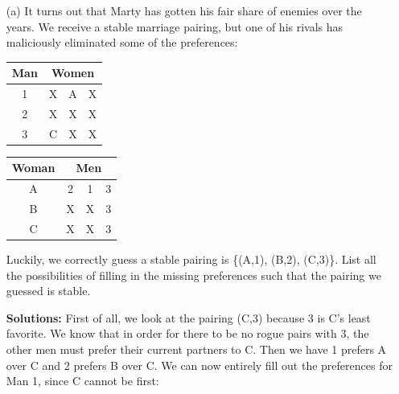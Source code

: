 \documentclass[11pt]{article}
\newif\ifsolutions
\renewcommand{\answer}[1]{{\color{mydarkblue}\textbf{Solutions: }#1}}
\begin{document}
\begin{qunlist}
\begin{itemize}



\end{itemize} 
    



\newpage

        

\begin{itemize}
\item[(a)] It turns out that Marty has gotten his fair share of enemies over the years. 
We receive a stable marriage pairing, but one of his rivals has maliciously eliminated some of the preferences:

\begin{center}
\begin{tabular}{|c|ccc|}\hline 
Man&\multicolumn{3}{|c|}{Women}\\\hline 
1&X&A&X\\\hline 
2&X&X&X\\\hline 
3&C&X&X\\\hline
\end{tabular} 
\hspace{2cm}
\begin{tabular}{|c|ccc|}\hline 
Woman&\multicolumn{3}{|c|}{Men}\\\hline 
A&2&1&3\\\hline 
B&X&X&3\\\hline 
C&X&X&3\\\hline
\end{tabular}
\end{center}
        
Luckily, we correctly guess a stable pairing is \{(A,1), (B,2), (C,3)\}. 
List all the possibilities of filling in the missing preferences such that the pairing we guessed is stable.

\ifsolutions
\answer{
First of all, we look at the pairing (C,3) because 3 is C's least favorite. 
We know that in order for there to be no rogue pairs with 3, 
the other men must prefer their current partners to C. 
Then we have 1 prefers A over C and 2 prefers B over C. 
We can now entirely fill out the preferences for Man 1, since C cannot be first:

}
\end{itemize}
\end{qunlist}
\end{document}
